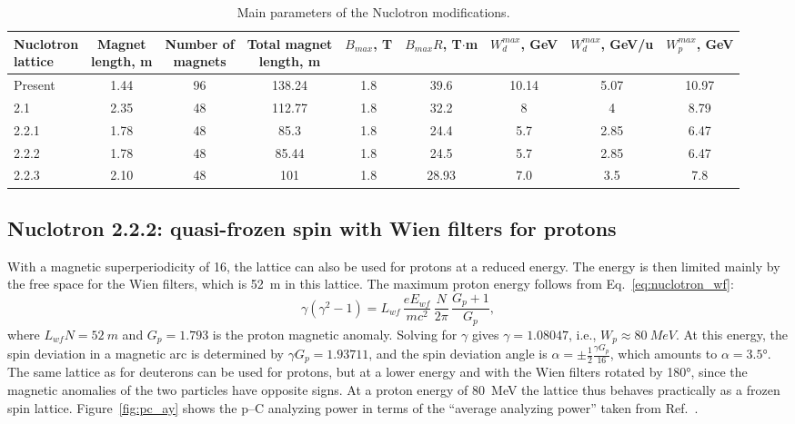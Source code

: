 \begin{table}[htbp]
  \centering
  \caption{Main parameters of the Nuclotron modifications.}
  \label{tab:nuclotron}
  \footnotesize
  \setlength{\tabcolsep}{2.5pt}
  \begin{tabular}{lcccccccc}
    \toprule
    \makecell[l]{Nuclotron\\lattice} & \makecell{Magnet\\length, m} & \makecell{Number of\\magnets}
      & \makecell{Total magnet\\length, m} & \makecell{$B_{max}$,\\T}
      & \makecell{$B_{max}R$,\\T$\cdot$m} & \makecell{$W_d^{max}$,\\GeV}
      & \makecell{$W_d^{max}$,\\GeV/u} & \makecell{$W_p^{max}$,\\GeV} \\
    \midrule
    Present & 1.44 & 96 & 138.24 & 1.8 & 39.6  & 10.14 & 5.07 & 10.97 \\
    2.1     & 2.35 & 48 & 112.77 & 1.8 & 32.2  & 8     & 4    & 8.79 \\
    2.2.1   & 1.78 & 48 & 85.3   & 1.8 & 24.4  & 5.7   & 2.85 & 6.47 \\
    2.2.2   & 1.78 & 48 & 85.44  & 1.8 & 24.5  & 5.7   & 2.85 & 6.47 \\
    2.2.3   & 2.10 & 48 & 101    & 1.8 & 28.93 & 7.0   & 3.5  & 7.8 \\
    \bottomrule
  \end{tabular}
\end{table}

\subsection{Nuclotron 2.2.2: quasi-frozen spin with Wien filters for protons}

With a magnetic superperiodicity of 16, the lattice can also be used for
protons at a reduced energy. The energy is then limited mainly by the free
space for the Wien filters, which is \SI{52}{m} in this lattice. The maximum
proton energy follows from Eq.~\eqref{eq:nuclotron_wf}:
\begin{equation}
  \gamma(\gamma^2-1) = L_{wf}\,\frac{eE_{wf}}{mc^2}\,\frac{N}{2\pi}\,\frac{G_p+1}{G_p},
\end{equation}
where $L_{wf}N = \SI{52}{m}$ and $G_p = 1.793$ is the proton magnetic anomaly.
Solving for $\gamma$ gives $\gamma = 1.08047$, i.e., $W_p\approx\SI{80}{MeV}$.
At this energy, the spin deviation in a magnetic arc is determined by
$\gamma G_p = 1.93711$, and the spin deviation angle is
$\alpha = \pm\frac{1}{2}\frac{\gamma G_p}{16}$, which amounts to
$\alpha = \ang{3.5}$.
The same lattice as for deuterons can be used for protons, but at a lower
energy and with the Wien filters rotated by \ang{180}, since the magnetic
anomalies of the two particles have opposite signs. At a proton energy of
\SI{80}{MeV} the lattice thus behaves practically as a frozen spin lattice.
Figure~\ref{fig:pc_ay} shows the p--C analyzing power in terms of the
``average analyzing power'' taken from Ref.~\cite{Mcnaughton:1985wyt}.

